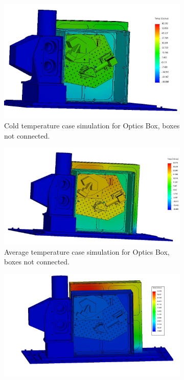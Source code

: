\begin{figure}
    \centering
    \begin{subfigure}[h]{0.6\textwidth}
        \centering
        \includegraphics[width=\textwidth]{chap3_images/LIFE_V4_images/TA_Full_Model_Iter_10.JPG}
        \caption{Cold temperature case simulation for Optics Box, boxes not connected.}
        \label{fig:LIFE_V4_TA_Optics_2a}
    \end{subfigure}
    \begin{subfigure}[h]{0.6\textwidth}
        \centering
        \includegraphics[width=\textwidth]{chap3_images/LIFE_V4_images/TA_Full_Model_Iter_11.JPG}
        \caption{Average temperature case simulation for Optics Box, boxes not connected.}
        \label{fig:LIFE_V4_TA_Optics_2b}
    \end{subfigure}
    \begin{subfigure}[h]{0.6\textwidth}
        \centering
        \includegraphics[width=\textwidth]{chap3_images/LIFE_V4_images/TA_Full_Model_Iter_12.JPG}

\end{subfigure}
\end{figure}
